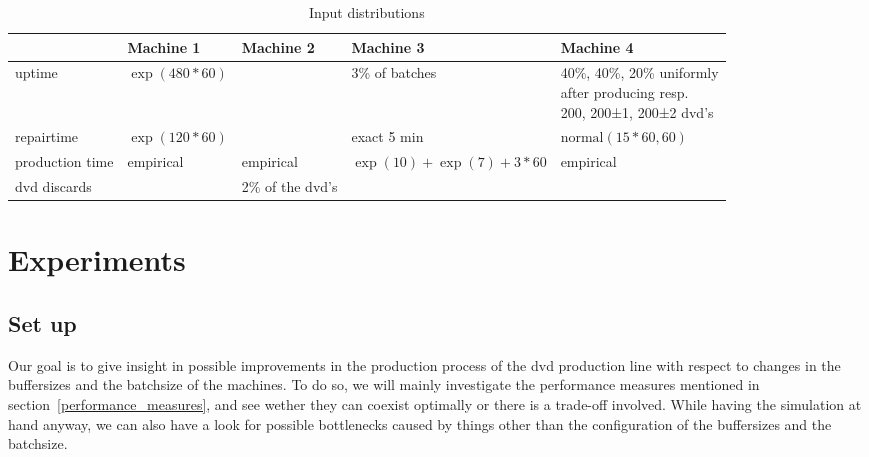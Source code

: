 \documentclass{article}
\begin{document}
\begin{table}[h]
    \begin{tabular}{|l|l|l|l|p{4cm}|}
    \hline
                    & Machine 1         & Machine 2         & Machine 3                     & Machine 4 \\ \hline
    uptime          & $\exp(480*60)$    &                   & 3\% of batches                & \parbox{5cm}{40\%, 40\%, 20\% uniformly\\ after producing resp.\\ 200, 200±1, 200±2 dvd's} \\ \hline
    repairtime      & $\exp(120*60)$    &                   & exact 5 min                   & $\mathrm{normal}(15*60, 60)$ \\ \hline
    production time & empirical         & empirical         & $\exp(10) + \exp(7) + 3*60$   & empirical \\ \hline
    dvd discards    &                   & 2\% of the dvd's  &                               & \\ \hline
    \end{tabular}
    \caption {Input distributions}
\end{table}









\section{Experiments}
%
\subsection{Set up}
Our goal is to give insight in possible improvements in the production process of the dvd production line with respect to changes in the buffersizes and the batchsize of the machines.
To do so, we will mainly investigate the performance measures mentioned in section~\ref{performance_measures}, and see wether they can coexist optimally or there is a trade-off involved.
While having the simulation at hand anyway, we can also have a look for possible bottlenecks caused by things other than the configuration of the buffersizes and the batchsize.
\end{document}

